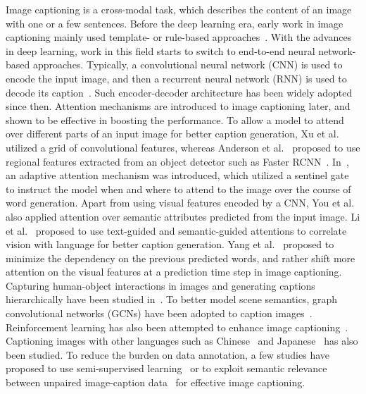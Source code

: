 \documentclass[journal]{IEEEtran}
\begin{document}
Image captioning is a cross-modal task, which describes the content of an image with one or a few sentences. Before the deep learning era, early work in image captioning mainly used template- or rule-based approaches~\cite{socher2010connecting,yao2010i2t,mitchell2012midge}. With the advances in deep learning, work in this field starts to switch to end-to-end neural network-based approaches. Typically, a convolutional neural network (CNN) is used to encode the input image, and then a recurrent neural network (RNN) is used to decode its caption~\cite{vinyals2015show,donahue2015long}. Such encoder-decoder architecture has been widely adopted since then. Attention mechanisms are introduced to image captioning later, and shown to be effective in boosting the performance. To allow a model to attend over different parts of an input image for better caption generation, Xu et al.~\cite{xu2015show} utilized a grid of convolutional features, whereas Anderson et al.~\cite{anderson2018bottom} proposed to use regional features extracted from an object detector such as Faster RCNN~\cite{ren2015faster}. In~\cite{lu2017knowing}, an adaptive attention mechanism was introduced, which utilized a sentinel gate to instruct the model when and where to attend to the image over the course of word generation.
Apart from using visual features encoded by a CNN, You et al.~\cite{you2016image} also applied attention over semantic attributes predicted from the input image. Li et al.~\cite{li2019vision} proposed to use text-guided and semantic-guided attentions to correlate vision with language for better caption generation. Yang et al.~\cite{yang2020captionnet} proposed to minimize the dependency on the previous predicted words, and rather shift more attention on the visual features at a prediction time step in image captioning. Capturing human-object interactions in images and generating captions hierarchically have been studied in~\cite{huo2021automatically}. To better model scene semantics, graph convolutional networks (GCNs) have been adopted to caption images~\cite{yao2018exploring,yang2019auto,nguyen2021defense}. Reinforcement learning has also been attempted to enhance image captioning~\cite{rennie2017self}. Captioning images with other languages such as Chinese~\cite{liu2020chinese} and Japanese~\cite{yoshikawa2017stair} has also been studied. To reduce the burden on data annotation, a few studies have proposed to use semi-supervised learning~\cite{yang2022cybersemi} or to exploit semantic relevance between unpaired image-caption data~\cite{song2022cyberunpaired} for effective image captioning.
\end{document}

